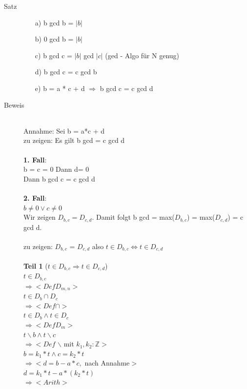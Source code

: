 \documentclass[a4paper,10pt]{article}
\newcommand{\ZN}{\mathbb{Z}} %
\newcommand{\Bold}[1]{\textbf{#1}} %
\newcommand{\Ra}{\Rightarrow}
\begin{document}
\begin{description}
	\item[Satz] \hfill
		\begin{itemize}
			\item[a)] b gcd b = $| b |$
			\item[b)] 0 gcd b = $| b |$
			\item[c)] b gcd c = $| b |$ gcd $| c |$ (ged - Algo f\"ur N genug)
			\item[d)] b gcd c = c gcd b
			\item[e)] b = a * c + d $\Ra$ b gcd c = c gcd d
		\end{itemize}
	\item[Beweis] \hfill \\
		Annahme: Sei b = a*c + d \\
		zu zeigen: Es gilt b gcd = c gcd d \\
		\\
		\Bold {1. Fall}: \\
		b = c = 0 Dann d= 0 \\
		Dann b gcd c = c gcd d\\
		\\
		\Bold {2. Fall}: \\
		$b \neq 0 \vee c \neq 0$ \\
		Wir zeigen $D_{b,c} = D_{c,d}$. Damit folgt b gcd = max($D_{b,c}$) = max($D_{c,d}$) = c gcd d. \\
		\\
		zu zeigen: $D_{b,c}$ = $D_{c,d}$ also $t \in D_{b,c} \Leftrightarrow t \in D_{c,d}$ \\
\\		
	\Bold {Teil 1} ($t \in D_{b,c} \Ra t \in D_{c,d}$) \\
	$t \in D_{b,c}$ \\
	$\Ra <Def D_{m,n}>$ \\
	$t \in D_b \cap D_c$ \\
	$\Ra < Def \cap>$ \\
	$t \in D_b \wedge t \in D_c$ \\
	$\Ra <Def D_m>$ \\
	$t\backslash b \wedge t \backslash c$ \\
	$\Ra < Def$ $\backslash$ mit $k_1,k_2:\ZN>$ \\
	$b = k_1 * t \wedge c = k_2 * t$ \\
	$\Ra < d= b- a*c,$ nach Annahme$>$ \\
	$d = k_1*t - a*(k_2*t)$ \\
	$\Ra <Arith>$ \\

\end{description}
\end{document}
